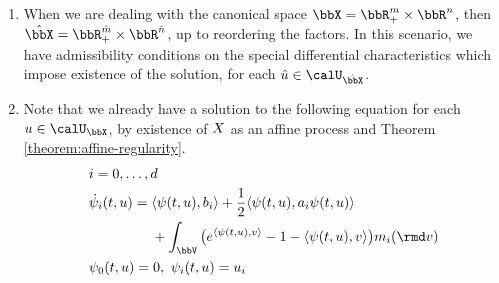 \begin{remark}
  \begin{enumerate}
    \item
      When we are dealing with the canonical space $\stateSpace = \bbR^m_+ \times \bbR^n$, then $\hat\stateSpace = \bbR^{\hat m}_+ \times \bbR^{\hat n}$, up to reordering the factors.
      In this scenario, we have admissibility conditions on the special differential characteristics which impose existence of the solution, for each $\hat\momentVar \in \boundedSpaceJoint$.
    \item
      Note that we already have a solution to the following equation for each $\momentVar \in \boundedSpace$, by existence of $X$ as an affine process and Theorem \ref{theorem:affine-regularity}.
      \begin{equation*}
        \begin{aligned}[t]
          &i = 0, \ldots, d \\
          & \dot\affPart_i(t, \momentVar) = \begin{aligned}[t]
            &\prj{\affPart(t, \momentVar)}{\affDriftPart_i} + \frac12\prj{\affPart(t, \momentVar)}{\affDiffPart_i\affPart(t,\momentVar)} \\
            &+ \int_\vecSpace \big( e^\prj{\affPart(t,\momentVar)}{\markVar} - 1 - \prj{\affPart(t,\momentVar)}{\markVar} \big) \affJumpPart_i(\rmd\markVar) 
          \end{aligned} \\
          & \affPart_0(t, \momentVar) = 0, ~ \affPart_i(t, \momentVar) = \momentVar_i
        \end{aligned}
      \end{equation*}
  \end{enumerate}
\end{remark}


